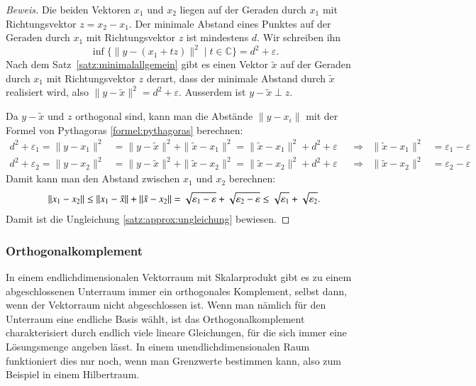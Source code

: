\begin{proof}[Beweis]
Die beiden Vektoren $x_1$ und $x_2$ liegen auf der Geraden durch $x_1$ 
mit Richtungsvektor $z=x_2-x_1$.
Der minimale Abstand eines Punktes auf der Geraden durch $x_1$ mit 
Richtungsvektor $z$ ist mindestens $d$.
Wir schreiben ihn
\[
\inf \{ \|y- (x_1+tz)\|^2 \;|\; t\in \mathbb C\}
=
d^2 + \varepsilon.
\]
Nach dem Satz~\ref{satz:minimalallgemein} gibt es einen Vektor $\tilde{x}$
auf der Geraden durch $x_1$ mit Richtungsvektor $z$ derart, dass der minimale
Abstand durch $\tilde{x}$ realisiert wird, also
$\|y-\tilde{x}\|^2 = d^2+\varepsilon$.
Ausserdem ist $y-\tilde{x}\perp z$.

Da $y-\tilde{x}$ und $z$ orthogonal sind, kann man die Abstände
$\|y-x_i\|$ mit der Formel von Pythagoras \eqref{formel:pythagoras}
berechnen:
\begin{align*}
d^2 + \varepsilon_1
=
\|y-x_1\|^2 &= \|y-\tilde{x}\|^2 + \|\tilde{x}-x_1\|^2
=
\|\tilde{x}-x_1\|^2 + d^2 + \varepsilon
&&\Rightarrow&
\|\tilde{x}-x_1\|^2&=\varepsilon_1-\varepsilon
\\
d^2 + \varepsilon_2
=
\|y-x_2\|^2 &= \|y-\tilde{x}\|^2 + \|\tilde{x}-x_2\|^2
=
\|\tilde{x}-x_2\|^2 + d^2 + \varepsilon
&&\Rightarrow&
\|\tilde{x}-x_2\|^2&=\varepsilon_2-\varepsilon
\end{align*}
Damit kann man den Abstand zwischen $x_1$ und $x_2$ berechnen:
\[
\|x_1-x_2\|
\le
\|x_1-\tilde{x}\| + \| \tilde{x}-x_2\|
=
\sqrt{\mathstrut\varepsilon_1-\varepsilon}
+
\sqrt{\mathstrut\varepsilon_2-\varepsilon}
\le
\sqrt{\mathstrut\varepsilon_1} + \sqrt{\mathstrut\varepsilon_2}.
\]
Damit ist die Ungleichung \ref{satz:approx:ungleichung} bewiesen.
\end{proof}

\subsubsection{Orthogonalkomplement}
%
In einem endlichdimensionalen Vektorraum mit Skalarprodukt gibt es zu
einem abgeschlossenen Unterraum immer ein orthogonales Komplement,
selbst dann, wenn der Vektorraum nicht abgeschlossen ist.
Wenn man nämlich für den Unterraum eine endliche Basis wählt, ist das
Orthogonalkomplement charakterisiert durch endlich viele lineare 
Gleichungen, für die sich immer eine Lösungsmenge angeben lässt.
In einem unendlichdimensionalen Raum funktioniert dies nur noch, wenn
man Grenzwerte bestimmen kann, also zum Beispiel in einem Hilbertraum.

